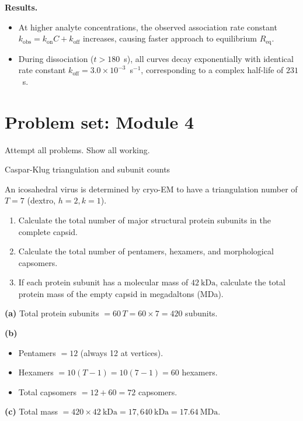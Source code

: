 \documentclass[12pt, a4paper, oneside]{report}
\begin{document}
\textbf{Results.}
\begin{itemize}
  \item At higher analyte concentrations, the observed association rate constant $k_{\text{obs}} = k_{\text{on}} C + k_{\text{off}}$ increases, causing faster approach to equilibrium $R_{\text{eq}}$.
  \item During dissociation ($t > 180$~s), all curves decay exponentially with identical rate constant $k_{\text{off}} = 3.0 \times 10^{-3}$~s$^{-1}$, corresponding to a complex half-life of $231$~s.
\end{itemize}

\newpage
\section{Problem set: Module 4}

\noindent Attempt all problems. Show all working.

\begin{problem}{\enspace{}\enspace
  Caspar-Klug triangulation and subunit counts}

  An icosahedral virus is determined by cryo-EM to have a triangulation number of $T = 7$ (dextro, $h=2, k=1$).

  \begin{enumerate}
    \item Calculate the total number of major structural protein subunits in the complete capsid.
    \item Calculate the total number of pentamers, hexamers, and morphological capsomers.
    \item If each protein subunit has a molecular mass of $42~\text{kDa}$, calculate the total protein mass of the empty capsid in megadaltons (MDa).
  \end{enumerate}
\end{problem}

\begin{solution}
  \textbf{(a)} Total protein subunits $= 60 \, T = 60 \times 7 = 420$ subunits.

  \textbf{(b)}
  \begin{itemize}
    \item Pentamers $= 12$ (always 12 at vertices).
    \item Hexamers $= 10(T - 1) = 10(7 - 1) = 60$ hexamers.
    \item Total capsomers $= 12 + 60 = 72$ capsomers.
  \end{itemize}

  \textbf{(c)} Total mass $= 420 \times 42~\text{kDa} = 17{,}640~\text{kDa} = 17.64~\text{MDa}$.
\end{solution}
\end{document}
